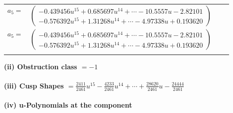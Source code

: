 \documentclass[1p]{elsarticle_modified}
\theoremstyle{definition}
\begin{document}
\begin{tabular}{m{7pt} m{180pt} m{7pt} m{180pt} }
\flushright $a_{5}=$&$\begin{pmatrix}-0.439456 u^{15}+0.685697 u^{14}+\cdots-10.5557 u-2.82101\\-0.576392 u^{15}+1.31268 u^{14}+\cdots-4.97338 u+0.193620\end{pmatrix}$\\ \flushright $a_{5}=$&$\begin{pmatrix}-0.439456 u^{15}+0.685697 u^{14}+\cdots-10.5557 u-2.82101\\-0.576392 u^{15}+1.31268 u^{14}+\cdots-4.97338 u+0.193620\end{pmatrix}$\\&\end{tabular}
\flushleft \textbf{(ii) Obstruction class $= -1$}\\~\\
\flushleft \textbf{(iii) Cusp Shapes $= \frac{2411}{2461} u^{15}-\frac{4233}{2461} u^{14}+\cdots+\frac{28620}{2461} u-\frac{24444}{2461}$}\\~\\
\newpage\renewcommand{\arraystretch}{1}
\flushleft \textbf{(iv) u-Polynomials at the component}\newline \\
\end{document}
